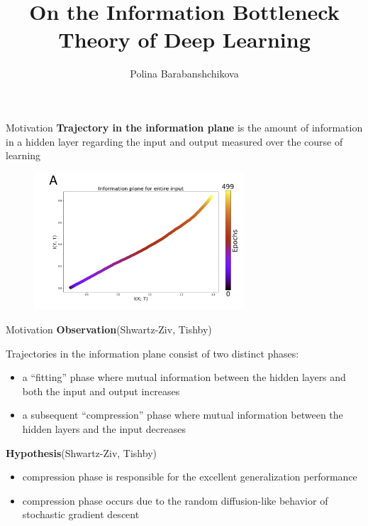 \documentclass[13pt]{beamer}				\usepackage{graphicx}
\title[On the Information Bottleneck Theory]{On the Information Bottleneck Theory of Deep Learning}
\author[Polina Barabanshchikova]{Polina Barabanshchikova}
\institute[MIPT]{MIPT}
\begin{document}
\begin{frame}
  \titlepage
\end{frame}

\begin{frame}{Motivation}
\textbf{Trajectory in the information plane}
is the amount of information in a hidden layer regarding the input and output measured over the
course of learning
\begin{figure}[h!]
    \includegraphics[width=0.7\textwidth, trim={0 0 0 0cm},clip]{images/InfB0.jpg}
\end{figure}
\end{frame}

\begin{frame}{Motivation}
\textbf{Observation}(Shwartz-Ziv, Tishby)

Trajectories in the information plane
consist of two distinct phases: 
\begin{itemize}
\item a “fitting” phase where mutual information between the hidden layers and both the input and output increases
\item a subsequent “compression” phase where mutual
information between the hidden layers and the input decreases
\end{itemize}
\textbf{Hypothesis}(Shwartz-Ziv, Tishby)
\begin{itemize}
\item compression phase is responsible for the excellent generalization performance
\item compression phase occurs due to the random diffusion-like behavior of stochastic
gradient descent
\end{itemize}
\end{frame}
\end{document}
